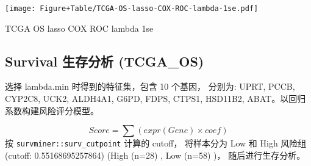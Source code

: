 \documentclass[
]{article}
\begin{document}
\begin{center}\vspace{1.5cm}\end{center}
\def\@captype{figure}
\begin{center}
\texttt{[image: Figure+Table/TCGA-OS-lasso-COX-ROC-lambda-1se.pdf]}
\caption{TCGA OS lasso COX ROC lambda 1se}\label{fig:TCGA-OS-lasso-COX-ROC-lambda-1se}
\end{center}

\begin{center}\vspace{1.5cm}\end{center}

\hypertarget{survival-ux751fux5b58ux5206ux6790-tcga_os}{%
\subsection{Survival 生存分析 (TCGA\_OS)}\label{survival-ux751fux5b58ux5206ux6790-tcga_os}}

选择 lambda.min 时得到的特征集，包含 10 个基因，
分别为: UPRT, PCCB, CYP2C8, UCK2, ALDH4A1, G6PD, FDPS, CTPS1, HSD11B2, ABAT。以回归系数构建风险评分模型。

\[ Score = \sum(expr(Gene) \times coef) \]
按 \texttt{survminer::surv\_cutpoint} 计算的 cutoff，
将样本分为 Low 和 High 风险组 (cutoff: 0.55168695257864)
(High (n=28) , Low (n=58) )， 随后进行生存分析。

\begin{center}\vspace{1.5cm}\end{center}

\begin{center}\vspace{1.5cm}\end{center}

\begin{center}\vspace{1.5cm}\end{center}

\begin{center}\vspace{1.5cm}\end{center}
\end{document}
